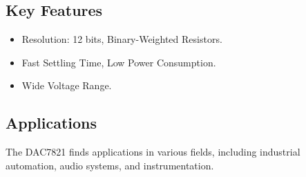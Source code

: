 \documentclass{article}
\begin{document}
\subsection{Key Features}

\begin{itemize}
    \item Resolution: 12 bits, Binary-Weighted Resistors.
    \item Fast Settling Time, Low Power Consumption.
    \item Wide Voltage Range.
\end{itemize}

\subsection{Applications}

The DAC7821 finds applications in various fields, including industrial automation, audio systems, and instrumentation.
\end{document}
